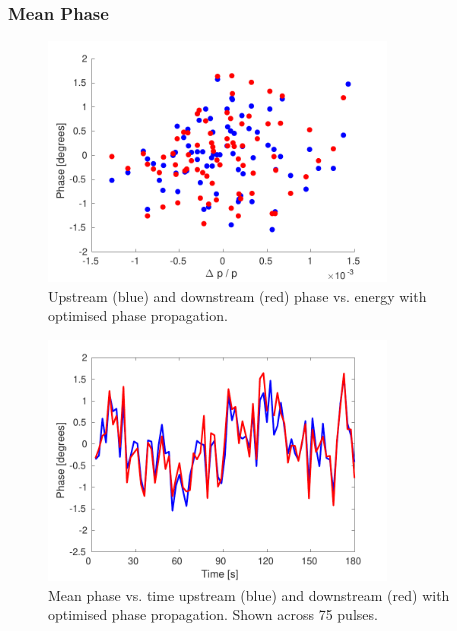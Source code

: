 \subsubsection{Mean Phase}

\begin{figure}
  \centering
  \includegraphics[width=0.8\textwidth]{Figures/propagation/bestProp_enCorr}
  \caption{Upstream (blue) and downstream (red) phase vs. energy with optimised phase propagation.}
  \label{f:bestProp_enCorr}
\end{figure}

\begin{figure}
  \centering
  \includegraphics[width=0.8\textwidth]{Figures/propagation/bestProp_meanPhase}
  \caption{Mean phase vs. time upstream (blue) and downstream (red) with optimised phase propagation. Shown across 75 pulses.}
  \label{f:bestProp_meanPhase}
\end{figure}

